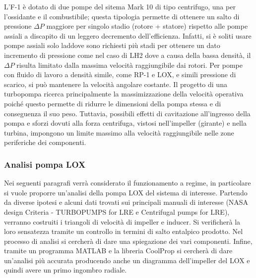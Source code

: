 L’F-1 è dotato di due pompe del sitema Mark 10 di tipo centrifugo, una per l’ossidante e il combustibile; questa tipologia permette di ottenere un salto di pressione $\Delta P$ maggiore per singolo stadio (rotore + statore) rispetto alle pompe assiali a discapito di un leggero decremento dell’efficienza. Infatti, si è soliti usare pompe assiali solo laddove sono richiesti più stadi per ottenere un dato incremento di pressione come nel caso di LH2 dove a causa della bassa densità, il $\Delta P$ risulta limitato dalla massima velocità raggiungibile dai rotori.  Per pompe con fluido di lavoro a densità simile, come RP-1 e LOX, e simili pressione di scarico, si può mantenere la velocità angolare costante. 
Il progetto di una turbopompa ricerca principalmente la massimizzazione della velocità operativa poiché questo permette di ridurre le dimensioni della pompa stessa e di conseguenza il suo peso. Tuttavia, possibili effetti di cavitazione all’ingresso della pompa e sforzi dovuti alla forza centrifuga, vistosi nell’impeller (girante) e nella turbina, impongono un limite massimo alla velocità raggiungibile nelle zone periferiche dei componenti.


\subsubsection{Analisi pompa LOX}
Nei seguenti paragrafi verrà considerato il funzionamento a regime, in particolare si vuole proporre un'analisi della pompa LOX del sistema di interesse. Partendo da diverse ipotesi e alcuni dati trovati sui principali manuali di interesse (NASA design Criteria - TURBOPUMPS for LRE e Centrifugal pumps for LRE), verranno costruiti i triangoli di velocità di impeller e inducer. Si verificherà la loro sensatezza tramite un controllo in termini di salto entalpico prodotto. Nel processo di analisi si cercherà di dare una spiegazione dei vari componenti. Infine, tramite un programma MATLAB e la libreria CoolProp si cercherà di dare un'analisi più accurata producendo anche un diagramma dell'impeller del LOX e quindi avere un primo ingombro radiale. 


